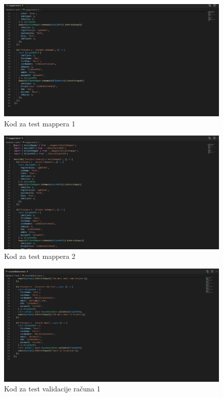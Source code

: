 			
			\begin{figure}[H]
				\includegraphics[width=1\linewidth]{images/Mapper1.png}
				\caption{Kod za test mappera 1}
				\label{fig:Mapper test - kod1} 
			\end{figure}
			
			\begin{figure}[H]
				\includegraphics[width=1\linewidth]{images/Mapper2.png}
				\caption{Kod za test mappera 2}
				\label{fig:Mapper test - kod2} 
			\end{figure}
			
			\begin{figure}[H]
				\includegraphics[width=1\linewidth]{images/RacunValidator1.png}
				\caption{Kod za test validacije računa 1}
				\label{fig:RacunValidator - kod1} 
			\end{figure}
			
